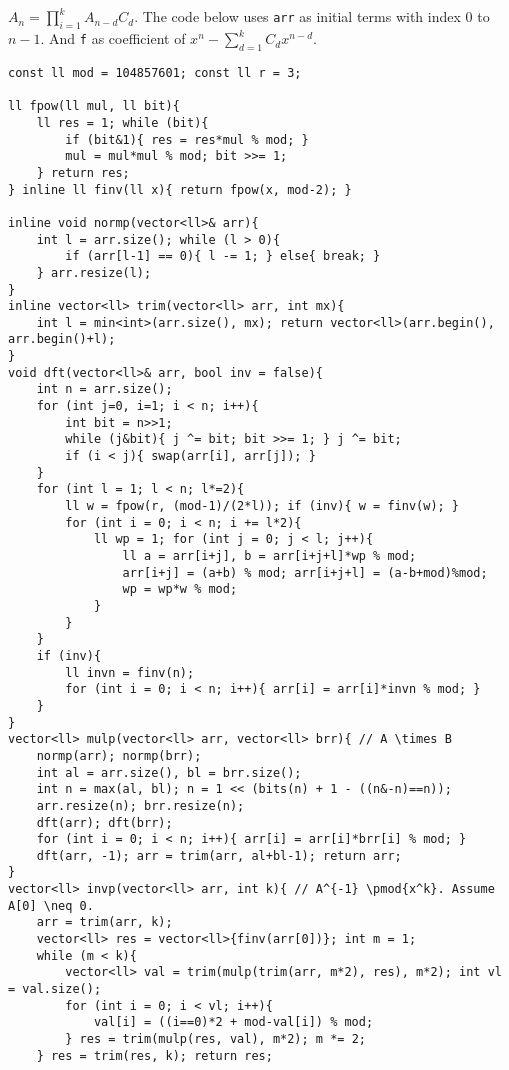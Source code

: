 \documentclass[landscape, 8pt, a4paper, oneside, twocolumn]{extarticle}
\begin{document}
\subsection{}
$A_n = \prod_{i=1}^{k} A_{n-d} C_{d}$. The code below uses \texttt{arr} as initial terms with index $0$ to $n-1$.
And \texttt{f} as coefficient of $x^n - \sum_{d=1}^{k} C_{d} x^{n-d}$.
\begin{verbatim}
const ll mod = 104857601; const ll r = 3;

ll fpow(ll mul, ll bit){
    ll res = 1; while (bit){
        if (bit&1){ res = res*mul % mod; }
        mul = mul*mul % mod; bit >>= 1;
    } return res;
} inline ll finv(ll x){ return fpow(x, mod-2); }

inline void normp(vector<ll>& arr){
    int l = arr.size(); while (l > 0){
        if (arr[l-1] == 0){ l -= 1; } else{ break; }
    } arr.resize(l);
}
inline vector<ll> trim(vector<ll> arr, int mx){
    int l = min<int>(arr.size(), mx); return vector<ll>(arr.begin(), arr.begin()+l);
}
void dft(vector<ll>& arr, bool inv = false){
    int n = arr.size();
    for (int j=0, i=1; i < n; i++){
        int bit = n>>1;
        while (j&bit){ j ^= bit; bit >>= 1; } j ^= bit;
        if (i < j){ swap(arr[i], arr[j]); }
    }
    for (int l = 1; l < n; l*=2){
        ll w = fpow(r, (mod-1)/(2*l)); if (inv){ w = finv(w); }
        for (int i = 0; i < n; i += l*2){
            ll wp = 1; for (int j = 0; j < l; j++){
                ll a = arr[i+j], b = arr[i+j+l]*wp % mod;
                arr[i+j] = (a+b) % mod; arr[i+j+l] = (a-b+mod)%mod;
                wp = wp*w % mod;
            }
        }
    }
    if (inv){
        ll invn = finv(n);
        for (int i = 0; i < n; i++){ arr[i] = arr[i]*invn % mod; }
    }
}
vector<ll> mulp(vector<ll> arr, vector<ll> brr){ // A \times B
    normp(arr); normp(brr);
    int al = arr.size(), bl = brr.size();
    int n = max(al, bl); n = 1 << (bits(n) + 1 - ((n&-n)==n));
    arr.resize(n); brr.resize(n);
    dft(arr); dft(brr);
    for (int i = 0; i < n; i++){ arr[i] = arr[i]*brr[i] % mod; }
    dft(arr, -1); arr = trim(arr, al+bl-1); return arr;
}
vector<ll> invp(vector<ll> arr, int k){ // A^{-1} \pmod{x^k}. Assume A[0] \neq 0.
    arr = trim(arr, k);
    vector<ll> res = vector<ll>{finv(arr[0])}; int m = 1;
    while (m < k){
        vector<ll> val = trim(mulp(trim(arr, m*2), res), m*2); int vl = val.size();
        for (int i = 0; i < vl; i++){
            val[i] = ((i==0)*2 + mod-val[i]) % mod;
        } res = trim(mulp(res, val), m*2); m *= 2;
    } res = trim(res, k); return res;

\end{verbatim}
\end{document}
